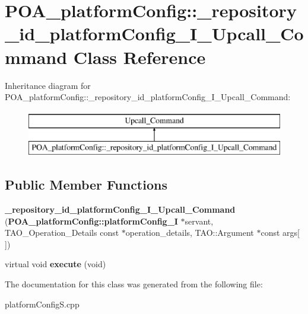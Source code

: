 \section{P\+O\+A\+\_\+platform\+Config\+:\+:\+\_\+repository\+\_\+id\+\_\+platform\+Config\+\_\+\+I\+\_\+\+Upcall\+\_\+\+Command Class Reference}
\label{classPOA__platformConfig_1_1__repository__id__platformConfig__I__Upcall__Command}
Inheritance diagram for P\+O\+A\+\_\+platform\+Config\+:\+:\+\_\+repository\+\_\+id\+\_\+platform\+Config\+\_\+\+I\+\_\+\+Upcall\+\_\+\+Command\+:\begin{figure}[H]
\begin{center}
\leavevmode
\includegraphics[height=2.000000cm]{classPOA__platformConfig_1_1__repository__id__platformConfig__I__Upcall__Command}
\end{center}
\end{figure}
\subsection*{Public Member Functions}
\begin{DoxyCompactItemize}
\item 
{\bfseries \+\_\+repository\+\_\+id\+\_\+platform\+Config\+\_\+\+I\+\_\+\+Upcall\+\_\+\+Command} ({\bf P\+O\+A\+\_\+platform\+Config\+::platform\+Config\+\_\+I} $\ast$servant, T\+A\+O\+\_\+\+Operation\+\_\+\+Details const $\ast$operation\+\_\+details, T\+A\+O\+::\+Argument $\ast$const args[$\,$])\label{classPOA__platformConfig_1_1__repository__id__platformConfig__I__Upcall__Command_aeb36d563d6362da90edb7d789e1ee8fd}

\item 
virtual void {\bfseries execute} (void)\label{classPOA__platformConfig_1_1__repository__id__platformConfig__I__Upcall__Command_a6e1a1da43c228eef0b64f58815947573}

\end{DoxyCompactItemize}


The documentation for this class was generated from the following file\+:\begin{DoxyCompactItemize}
\item 
platform\+Config\+S.\+cpp\end{DoxyCompactItemize}
